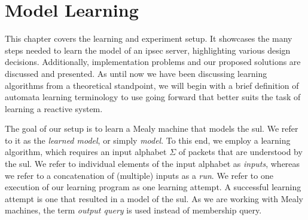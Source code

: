 %
%
% 
% 
% 

\chapter{Model Learning}

\label{chap:Learning}


This chapter covers the learning and experiment setup. It showcases the many steps needed to learn the model of an \ac{ipsec} server, highlighting various design decisions. Additionally, implementation problems and our proposed solutions are discussed and presented. As until now we have been discussing learning algorithms from a theoretical standpoint, we will begin with a brief definition of automata learning terminology to use going forward that better suits the task of learning a reactive system. 

The goal of our setup is to learn a Mealy machine that models the \ac{sul}. We refer to it as the \textit{learned model}, or simply \textit{model}. To this end, we employ a learning algorithm, which requires an input alphabet $\Sigma$ of packets that are understood by the \ac{sul}. We refer to individual elements of the input alphabet as \textit{inputs}, whereas we refer to a concatenation of (multiple) inputs as a \textit{run}. We refer to one execution of our learning program as one learning attempt. A successful learning attempt is one that resulted in a model of the \ac{sul}. As we are working with Mealy machines, the term \textit{output query} is used instead of membership query.

